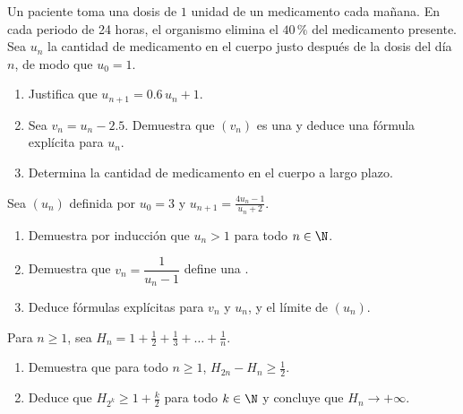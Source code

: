 \begin{exercise}[$\star\star$]\label{exo:g12:seq:7}
Un paciente toma una dosis de $1$ unidad de un medicamento cada mañana. En
cada periodo de 24 horas, el organismo elimina el $40\,\%$ del medicamento
presente. Sea $u_n$ la cantidad de medicamento en el cuerpo justo después
de la dosis del día $n$, de modo que $u_0 = 1$.
\begin{enumerate}
  \item Justifica que $u_{n+1} = 0.6\,u_n + 1$.
  \item Sea $v_n = u_n - 2.5$. Demuestra que $(v_n)$ es una  y deduce una fórmula explícita para $u_n$.
  \item Determina la cantidad de medicamento en el cuerpo a largo plazo.
\end{enumerate}
\end{exercise}

\begin{exercise}[$\star\star$]\label{exo:g12:seq:8}
Sea $(u_n)$ definida por $u_0 = 3$ y $u_{n+1} = \frac{4u_n - 1}{u_n + 2}$.
\begin{enumerate}
  \item Demuestra por inducción que $u_n > 1$ para todo $n \in \N$.
  \item Demuestra que $v_n = \dfrac{1}{u_n - 1}$ define una .
  \item Deduce fórmulas explícitas para $v_n$ y $u_n$, y el límite de
        $(u_n)$.
\end{enumerate}
\end{exercise}

\begin{exercise}[$\star\star\star$]\label{exo:g12:seq:9}
Para $n \geq 1$, sea
$H_n = 1 + \frac{1}{2} + \frac{1}{3} + \dots + \frac{1}{n}$.
\begin{enumerate}
  \item Demuestra que para todo $n \geq 1$, $H_{2n} - H_n \geq \frac{1}{2}$.
  \item Deduce que $H_{2^k} \geq 1 + \frac{k}{2}$ para todo $k \in \N$ y
        concluye que $H_n \to +\infty$.
\end{enumerate}
\end{exercise}

